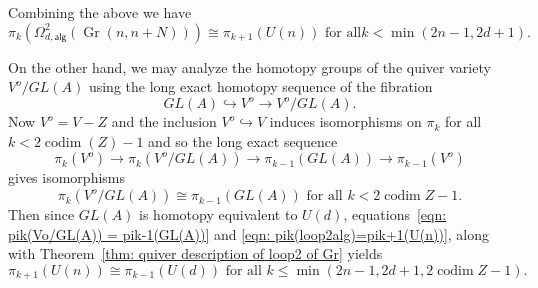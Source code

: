 \documentclass{amsart}
\theoremstyle{definition}
\newcommand{\alg}{\mathsf{alg}}
\newcommand{\Gr}{\operatorname{Gr}}
\newcommand{\LoopTwo}{\Omega^{2}_{d,\alg}}
\newcommand{\codim}{\operatorname{codim}}
\begin{document}
Combining the above we have
\begin{equation}\label{eqn: pik(loop2alg)=pik+1(U(n))}
\pi_{k}(\LoopTwo (\Gr (n,n+N))) \cong \pi_{k+1}(U(n)) \text{  for all
} k<\min (2n-1,2d+1).
\end{equation}


On the other hand, we may analyze the homotopy groups of the quiver
variety $V^{o}/GL(A)$ using the long exact homotopy sequence of the
fibration
\[
GL(A)\hookrightarrow V^{o} \to V^{o}/GL(A). 
\]
Now $V^{o} = V-Z$ and the inclusion $V^{o} \hookrightarrow V$ induces
isomorphisms on $\pi_{k}$ for all $k< 2\codim(Z)-1$
\cite[Prop~7.1]{Anderson-Fulton} and so the long exact sequence
\[
\pi_{k}(V^{o})\to \pi_{k}(V^{o}/GL(A)) \to \pi_{k-1}(GL(A)) \to \pi_{k-1}(V^{o})
\]
gives isomorphisms
\begin{equation}\label{eqn: pik(Vo/GL(A)) = pik-1(GL(A))}
\pi_{k}(V^{o}/GL(A))\cong \pi_{k-1}(GL(A)) \text{  for all $k<2\codim Z
-1$}.
\end{equation}
Then since $GL(A)$ is homotopy equivalent to $U(d)$,
equations~\eqref{eqn: pik(Vo/GL(A)) = pik-1(GL(A))} and \eqref{eqn:
pik(loop2alg)=pik+1(U(n))}, along with Theorem~\ref{thm: quiver
description of loop2 of Gr} yields
\begin{equation}\label{eqn: main homotopy equivalence with one
superfluous condition}
\pi_{k+1}(U(n))\cong \pi_{k-1}(U(d))\text{   for all   } k\leq \min
(2n-1,2d+1, 2\codim Z - 1).
\end{equation}
\end{document}
